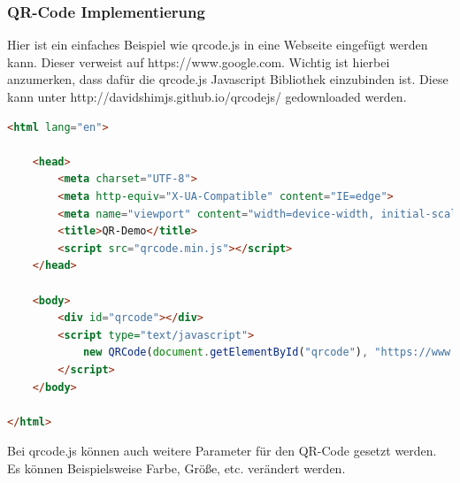 \subsubsection{QR-Code Implementierung}
Hier ist ein einfaches Beispiel wie qrcode.js in eine Webseite eingefügt werden kann.
Dieser verweist auf https://www.google.com. Wichtig ist hierbei anzumerken, dass dafür die qrcode.js Javascript Bibliothek einzubinden ist.
Diese kann unter http://davidshimjs.github.io/qrcodejs/ gedownloaded werden. %
\begin{lstlisting}[language=html,caption=QR-Code Demo,label=lst:tech:gaussianBlur]
<html lang="en">

    <head>
        <meta charset="UTF-8">
        <meta http-equiv="X-UA-Compatible" content="IE=edge">
        <meta name="viewport" content="width=device-width, initial-scale=1.0">
        <title>QR-Demo</title>
        <script src="qrcode.min.js"></script>
    </head>
    
    <body>
        <div id="qrcode"></div>
        <script type="text/javascript">
            new QRCode(document.getElementById("qrcode"), "https://www.google.com");
        </script>
    </body>
    
</html>
\end{lstlisting}

Bei qrcode.js können auch weitere Parameter für den QR-Code gesetzt werden. Es können
Beispielsweise Farbe, Größe, etc. verändert werden.

